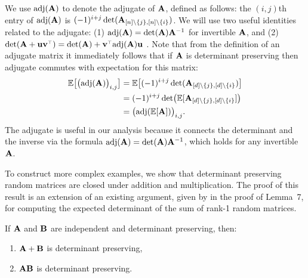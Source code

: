 \documentclass[../../thesis.tex]{subfiles}
\begin{document}
We use $\operatorname{\textnormal{adj}}(\mathbf A)$ to denote the adjugate of $\mathbf A$, defined as follows: the
$(i,j)$th entry of $\operatorname{\textnormal{adj}}(\mathbf A)$ is
$(-1)^{i+j}\det(\mathbf A_{[n]\backslash\{j\},[n]\backslash\{i\}})$.
We will use two useful identities related to the adjugate: (1)
$\operatorname{\textnormal{adj}}(\mathbf A)=\det(\mathbf A)\mathbf A^{-1}$ for invertible $\mathbf A$, and (2)
$\det(\A+\u\v^\top)=\det(\A)+\v^\top\!\adj(\A)\u$
\citep[see Fact 2.14.2 in][]{matrix-mathematics}.
Note that from the definition of an adjugate matrix it immediately follows that if $\mathbf A$ is
determinant preserving then adjugate commutes with expectation for this matrix:
\begin{align}
  \mathbb E\big[\big(\!\operatorname{\textnormal{adj}}(\mathbf A)\big)_{i,j}\big] & =
  \mathbb E\big[(-1)^{i+j}\det(\mathbf A_{[d]\backslash\{j\},[d]\backslash\{i\}})\big]\nonumber
  \\
                                         & =(-1)^{i+j}\det\!\big(\mathbb E[\mathbf A_{[d]\backslash\{j\},[d]\backslash\{i\}}]\big)
  \\
                                         & = \big(\!\operatorname{\textnormal{adj}}(\mathbb E[\mathbf A])\big)_{i,j}.\label{eq:adj}
\end{align}
The adjugate is useful in our analysis because it connects the
determinant and the inverse via the formula
$\operatorname{\textnormal{adj}}(\mathbf A)=\det(\mathbf A)\mathbf A^{-1}$, which holds for any invertible $\mathbf A$.

To construct more complex examples, we show that determinant preserving random matrices are
closed under addition and multiplication. The proof of this result is
an extension of an existing argument, given by
\cite{determinantal-averaging} in the proof of Lemma~7, for computing
the expected determinant of the sum of rank-1 random matrices.
\begin{lemma}\label{t:ring}
  If $\mathbf A$ and $\mathbf B$ are independent and determinant preserving, then:
  \vspace{-1mm}
  \begin{enumerate}
    \item $\mathbf A+\mathbf B$ is determinant preserving,
          \vspace{-2mm}
    \item $\mathbf A\mathbf B$ is determinant preserving.
  \end{enumerate}
\end{lemma}
\end{document}
